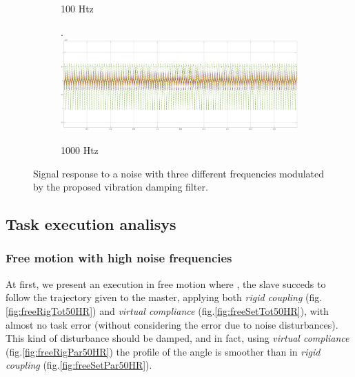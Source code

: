 \begin{figure}
\begin{subfigure}[h!]{1\linewidth}
		\caption{100 Htz}
		\label{fig:100Htz}
	\end{subfigure}	
  \newline
	\begin{subfigure}[h!]{1\linewidth}
		\centering.
		\includegraphics[width=\textwidth, height=\textwidth/3]{Images/vibr1000Htz}
		\caption{1000 Htz}
		\label{fig:1000Htz}
	\end{subfigure}
\caption{ Signal response to a noise with three different frequencies modulated 
  by the proposed vibration damping filter.}
\end{figure}

\newpage

\subsection{Task execution analisys}

\subsubsection{Free motion with high noise frequencies}

At first, we present an execution in free motion where , the
slave succeds to follow the trajectory given to the master, applying both
\textsl{rigid coupling} (fig.\ref{fig:freeRigTot50HR}) and \textsl{virtual
  compliance} (fig.\ref{fig:freeSetTot50HR}), with almost no task error
(without considering the error due to noise disturbances).
This kind of disturbance should be damped, and in fact, using \textsl{virtual
  compliance} (fig.\ref{fig:freeRigPar50HR}) the profile of the angle is smoother
than in \textsl{rigid coupling} (fig.\ref{fig:freeSetPar50HR}).

